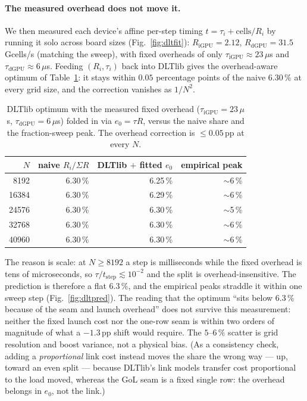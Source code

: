\documentclass[
	english,
	letterpaper, oneside
]{article}
\begin{document}
\paragraph{The measured overhead does not move it.} We then measured each device's
affine per-step timing $t = \tau_i + \text{cells}/R_i$ by running it solo across board
sizes (Fig.~\ref{fig:dltfit}): $R_\text{iGPU}=2.12$, $R_\text{dGPU}=31.5$\,Gcells/s
(matching the sweep), with fixed overheads of only $\tau_\text{iGPU}\approx23\,\mu$s and
$\tau_\text{dGPU}\approx6\,\mu$s. Feeding $(R_i,\tau_i)$ back into DLTlib gives the
overhead-aware optimum of Table~\ref{tab:dlt}: it stays within $0.05$ percentage points
of the naive $6.30\,\%$ at every grid size, and the correction vanishes as $1/N^2$.

\begin{table}[H]
	\centering
	\caption{DLTlib optimum with the measured fixed overhead ($\tau_\text{iGPU}=23\,\mu$s,
	$\tau_\text{dGPU}=6\,\mu$s) folded in via $e_0=\tau R$, versus the naive share and the
	fraction-sweep peak. The overhead correction is $\le 0.05$\,pp at every $N$.}
	\label{tab:dlt}
	\begin{tabular}{@{}rrrr@{}}
		\toprule
		$N$ & naive $R_i/\Sigma R$ & DLTlib $+$ fitted $e_0$ & empirical peak \\
		\midrule
		8192  & 6.30\,\% & 6.25\,\% & $\sim$6\,\% \\
		16384 & 6.30\,\% & 6.29\,\% & $\sim$6\,\% \\
		24576 & 6.30\,\% & 6.30\,\% & $\sim$5\,\% \\
		32768 & 6.30\,\% & 6.30\,\% & $\sim$6\,\% \\
		40960 & 6.30\,\% & 6.30\,\% & $\sim$6\,\% \\
		\bottomrule
	\end{tabular}
\end{table}

The reason is scale: at $N\ge 8192$ a step is milliseconds while the fixed overhead is
tens of microseconds, so $\tau/t_\text{step}\lesssim 10^{-2}$ and the split is
overhead-insensitive. The prediction is therefore a flat $6.3\,\%$, and the empirical
peaks straddle it within one sweep step (Fig.~\ref{fig:dltpred}). The reading that the
optimum ``sits below $6.3\,\%$ because of the seam and launch overhead'' does not survive
this measurement: neither the fixed launch cost nor the one-row seam is within two orders
of magnitude of what a $-1.3$\,pp shift would require. The $5$--$6\,\%$ scatter is grid
resolution and boost variance, not a physical bias. (As a consistency check, adding a
\emph{proportional} link cost instead moves the share the wrong way --- up, toward an
even split --- because DLTlib's link models transfer cost proportional to the load moved,
whereas the GoL seam is a fixed single row: the overhead belongs in $e_0$, not the link.)
\end{document}
